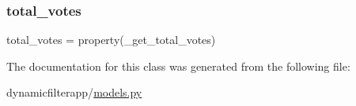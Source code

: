 \subsubsection{\texorpdfstring{total\_votes}{total\_votes}}
{\footnotesize\ttfamily total\+\_\+votes = property(\+\_\+get\+\_\+total\+\_\+votes)\hspace{0.3cm}{\ttfamily [static]}}



The documentation for this class was generated from the following file\+:\begin{DoxyCompactItemize}
\item 
dynamicfilterapp/\mbox{\hyperlink{models_8py}{models.\+py}}\end{DoxyCompactItemize}

